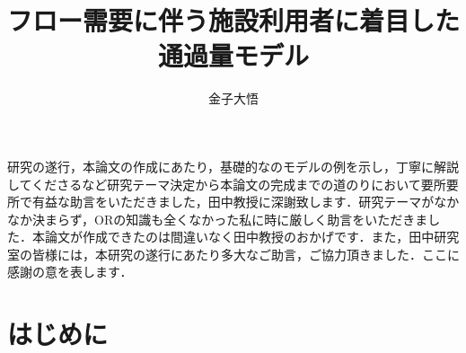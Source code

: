 \documentclass[dvipdfmx, 12pt]{jarticle}
\title{フロー需要に伴う施設利用者に着目した\\
\vspace{4mm}通過量モデル}
\author{金子大悟}
\institute{慶應義塾大学理工学部}{管理工学科}
\begin{document}
\maketitle


\begin{acknowledgments}

研究の遂行，本論文の作成にあたり，基礎的なのモデルの例を示し，丁寧に解説してくださるなど研究テーマ決定から本論文の完成までの道のりにおいて要所要所で有益な助言をいただきました，田中教授に深謝致します．研究テーマがなかなか決まらず，ORの知識も全くなかった私に時に厳しく助言をいただきました．本論文が作成できたのは間違いなく田中教授のおかげです．また，田中研究室の皆様には，本研究の遂行にあたり多大なご助言，ご協力頂きました．ここに感謝の意を表します．

\end{acknowledgments}


\tableofcontents
\newpage
{}

\section{はじめに}
\end{document}
